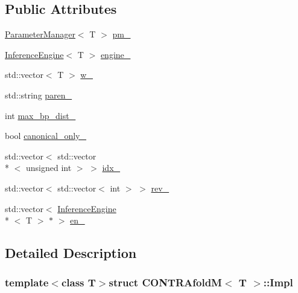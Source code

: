 \subsection*{Public Attributes}
\begin{DoxyCompactItemize}
\item 
\hyperlink{class_parameter_manager}{Parameter\+Manager}$<$ T $>$ \hyperlink{struct_c_o_n_t_r_afold_m_1_1_impl_a60c3b1fda2951015e561097906d52032}{pm\+\_\+}
\item 
\hyperlink{class_inference_engine}{Inference\+Engine}$<$ T $>$ \hyperlink{struct_c_o_n_t_r_afold_m_1_1_impl_acd8955919fbf8c8f9d86fc195a00cdb0}{engine\+\_\+}
\item 
std\+::vector$<$ T $>$ \hyperlink{struct_c_o_n_t_r_afold_m_1_1_impl_a0d3688ca0a9ab1331d4976e92d2e8513}{w\+\_\+}
\item 
std\+::string \hyperlink{struct_c_o_n_t_r_afold_m_1_1_impl_ad7f267d1860e0ccdeb4f5f269f1672c6}{paren\+\_\+}
\item 
int \hyperlink{struct_c_o_n_t_r_afold_m_1_1_impl_a9bf98e3520a857cc2f74c4c498c15f94}{max\+\_\+bp\+\_\+dist\+\_\+}
\item 
bool \hyperlink{struct_c_o_n_t_r_afold_m_1_1_impl_ab91edfe6d89438fdb6bf2edb6eeaa199}{canonical\+\_\+only\+\_\+}
\item 
std\+::vector$<$ std\+::vector\\*
$<$ unsigned int $>$ $>$ \hyperlink{struct_c_o_n_t_r_afold_m_1_1_impl_ae0d86d3732f74d42ba6cc5993185aebb}{idx\+\_\+}
\item 
std\+::vector$<$ std\+::vector$<$ int $>$ $>$ \hyperlink{struct_c_o_n_t_r_afold_m_1_1_impl_a01416d1629455fa35c6c215f271b49de}{rev\+\_\+}
\item 
std\+::vector$<$ \hyperlink{class_inference_engine}{Inference\+Engine}\\*
$<$ T $>$ $\ast$ $>$ \hyperlink{struct_c_o_n_t_r_afold_m_1_1_impl_a340457442751e450885b41148f2f8d04}{en\+\_\+}
\end{DoxyCompactItemize}


\subsection{Detailed Description}
\subsubsection*{template$<$class T$>$struct C\+O\+N\+T\+R\+Afold\+M$<$ T $>$\+::\+Impl}



